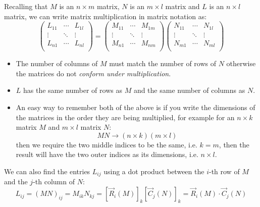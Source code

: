 \documentclass[../main.tex]{subfiles}
\begin{document}
Recalling that $M$ is an $n \times m$ matrix, $N$ is an $m \times l$ matrix and $L$ is an $n \times l$ matrix, we can write matrix multiplication in matrix notation as:
\[
  \begin{pmatrix}
  L_{1 1} & \cdots & L_{1 l} \\
  \vdots & \ddots & \vdots \\
  L_{n 1} & \cdots & L_{n l} \\
  \end{pmatrix} =
  \begin{pmatrix}
  M_{1 1} & \cdots & M_{1 m} \\
  \vdots & \ddots & \vdots \\
  M_{n 1} & \cdots & M_{n m} \\
  \end{pmatrix}
  \begin{pmatrix}
  N_{1 1} & \cdots & N_{1 l} \\
  \vdots & \ddots & \vdots \\
  N_{m 1} & \cdots & N_{m l} \\
  \end{pmatrix}
\]
\begin{remark}[Remarks]
  \begin{itemize}
    \item The number of columns of $M$ must match the number of rows of $N$ otherwise the matrices do not \textit{conform under multiplication}.
    \item $L$ has the same number of rows as $M$ and the same number of columns as $N$.
    \item An easy way to remember both of the above is if you write the dimensions of the matrices in the order they are being multiplied, for example for an $n \times k$ matrix $M$ and $m \times l$ matrix $N$:
      \[
        MN \to (n \times k) (m \times l)
      \]
      then we require the two middle indices to be the same, i.e. $k = m$, then the result will have the two outer indices as its dimensions, i.e. $n \times l$.
  \end{itemize}
\end{remark}
We can also find the entries $L_{i j}$ using a dot product between the $i$-th row of $M$ and the $j$-th column of $N$:
\begin{equation}
  L_{i j} = (MN)_{i j} = M_{i k}N_{k j} = [\vec{R}_i(M)]_k [\vec{C}_j(N)]_k = \vec{R}_i(M) \cdot \vec{C}_j(N) \label{matrixMultRC}
\end{equation}
\end{document}
